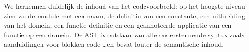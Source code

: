 We herkennen duidelijk de inhoud van het codevoorbeeld: op het hoogste niveau
zien we de module met een naam, de definitie van een constante, een uitbreiding
van het domein, een functie definitie en een geannoteerde applicatie van een
functie op een domein. De AST is ontdaan van alle ondersteunende syntax zoals
aanduidingen voor blokken code \dots en bevat louter de semantische inhoud.
